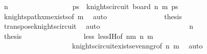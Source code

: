 \begin{isabellebody}
\ {\isachardoublequoteopen}n{\isacharminus}{\kern0pt}{}\ {\isacharequal}{\kern0pt}\ {}{\isachardoublequoteclose}\isanewline
\ \ \ \ \ \ \ \ \ \ \ \ \isamarkupfalse%
\ \isamarkupfalse%
\ ps\ \ {\isachardoublequoteopen}knights{\isacharunderscore}{\kern0pt}circuit\ {\isacharparenleft}{\kern0pt}board\ {\isacharparenleft}{\kern0pt}n{\isacharminus}{\kern0pt}{}{\isacharparenright}{\kern0pt}\ m{\isacharparenright}{\kern0pt}\ ps{\isachardoublequoteclose}\isanewline
\ \ \ \ \ \ \ \ \ \ \ \ \ \ \isamarkupfalse%
\ knights{\isacharunderscore}{\kern0pt}path{\isacharunderscore}{\kern0pt}{}xm{\isacharunderscore}{\kern0pt}exists{\isacharbrackleft}{\kern0pt}of\ m{\isacharbrackright}{\kern0pt}\ \isamarkupfalse%
\ auto\isanewline
\ \ \ \ \ \ \ \ \ \ \ \ \isamarkupfalse%
\ \isamarkupfalse%
\ {\isacharquery}{\kern0pt}thesis\ \isanewline
\ \ \ \ \ \ \ \ \ \ \ \ \ \ \isamarkupfalse%
\ transpose{\isacharunderscore}{\kern0pt}knights{\isacharunderscore}{\kern0pt}circuit\ \isamarkupfalse%
\ auto\isanewline
\ \ \ \ \ \ \ \ \ \ \isamarkupfalse%
\isanewline
\ \ \ \ \ \ \ \ \ \ \ \ \isamarkupfalse%
\ {\isachardoublequoteopen}n{\isacharminus}{\kern0pt}{}\ {\isasymge}\ {}{}{\isachardoublequoteclose}\isanewline
\ \ \ \ \ \ \ \ \ \ \ \ \isamarkupfalse%
\ \isamarkupfalse%
\ {\isacharquery}{\kern0pt}thesis\ \isanewline
\ \ \ \ \ \ \ \ \ \ \ \ \ \ \isamarkupfalse%
\ less\ less{\isachardot}{\kern0pt}IH{\isacharbrackleft}{\kern0pt}of\ {\isachardoublequoteopen}n{\isacharminus}{\kern0pt}{}{}{\isacharplus}{\kern0pt}m{\isachardoublequoteclose}\ {\isachardoublequoteopen}n{\isacharminus}{\kern0pt}{}{}{\isachardoublequoteclose}\ m{\isacharbrackright}{\kern0pt}\isanewline
\ \ \ \ \ \ \ \ \ \ \ \ \ \ \ \ \ \ \ \ knights{\isacharunderscore}{\kern0pt}circuit{\isacharunderscore}{\kern0pt}exists{\isacharunderscore}{\kern0pt}even{\isacharunderscore}{\kern0pt}n{\isacharunderscore}{\kern0pt}gr{}{}{\isacharbrackleft}{\kern0pt}of\ {\isachardoublequoteopen}n{\isacharminus}{\kern0pt}{}{\isachardoublequoteclose}\ m{\isacharbrackright}{\kern0pt}\ \isamarkupfalse%
\ auto\isanewline
\ \ \ \ \ \ \ \ \ \ \isamarkupfalse%
\isanewline
\ \ \ \ \ \ \ \ \isamarkupfalse%
\isanewline

\end{isabellebody}
